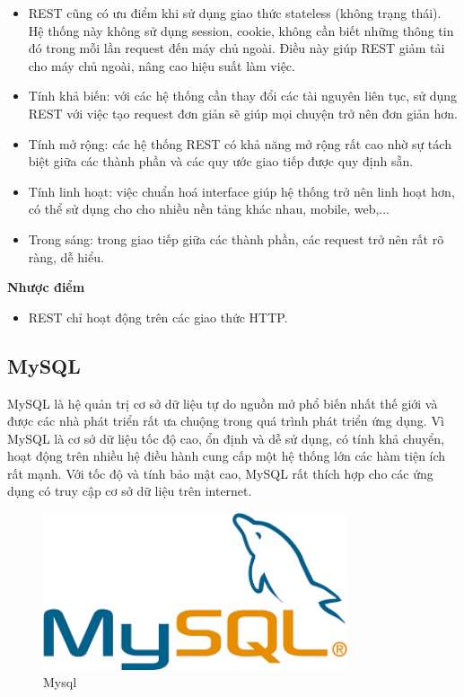 	        \begin{itemize}
	            \item REST cũng có ưu điểm khi sử dụng giao thức stateless (không trạng thái). Hệ thống này không sử dụng session, cookie, không cần biết những thông tin đó trong mỗi lần request đến máy chủ ngoài. Điều này giúp REST giảm tải cho máy chủ ngoài, nâng cao hiệu suất làm việc.
	            \item Tính khả biến: với các hệ thống cần thay đổi các tài nguyên liên tục, sử dụng REST với việc tạo request đơn giản sẽ giúp mọi chuyện trở nên đơn giản hơn.
	            \item Tính mở rộng: các hệ thống REST có khả năng mở rộng rất cao nhờ sự tách biệt giữa các thành phần và các quy ước giao tiếp được quy định sẵn.
	            \item Tính linh hoạt: việc chuẩn hoá interface giúp hệ thống trở nên linh hoạt hơn, có thể sử dụng cho cho nhiều nền tảng khác nhau, mobile, web,...
	            \item Trong sáng: trong giao tiếp giữa các thành phần, các request trở nên rất rõ ràng, dễ hiểu.
	        \end{itemize}
	        
		    \textbf{Nhược điểm}
		    
	        \begin{itemize}
	            \item REST chỉ hoạt động trên các giao thức HTTP.
	        \end{itemize}
	 
            \subsection{MySQL}
            
            MySQL là hệ quản trị cơ sở dữ liệu tự do nguồn mở phổ biến nhất thế giới và được các nhà phát triển rất ưa chuộng trong quá trình phát triển ứng dụng. Vì MySQL là cơ sở dữ liệu tốc độ cao, ổn định và dễ sử dụng, có tính khả chuyển, hoạt động trên nhiều hệ điều hành cung cấp một hệ thống lớn các hàm tiện ích rất mạnh. Với tốc độ và tính bảo mật cao, MySQL rất thích hợp cho các ứng dụng có truy cập cơ sở dữ liệu trên internet.
            
            \begin{figure}[H]   			\includegraphics[width=0.8\textwidth]{Images/mysqlintro.png}
            	\centering
            	\linebreak
            	\caption{Mysql}
            \end{figure}
            
